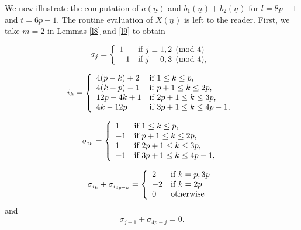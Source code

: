 \documentclass[11pt,reqno]{amsart}
\theoremstyle{definition}
\numberwithin{equation}{section}
\begin{document}
We now illustrate the computation of $a({\underline{n}})$ and $b_1({\underline{n}}) + b_2({\underline{n}})$ for $l=8p-1$ and $t=6p-1$. The routine evaluation of $X(\underline{n})$
is left to the reader. First, we take $m=2$ in Lemmas \ref{l8} and \ref{l9} to obtain

\begin{equation} \label{step0}
\sigma_{j} = \left\{
\begin{array}{ll}
1 & \text{if $j \equiv 1, 2 \pmod{4}$} \\
-1 & \text{if $j \equiv 0, 3 \pmod{4},$} \\
\end{array} \right. \\
\end{equation}

\begin{equation} \label{step1}
i_k = \left\{
\begin{array}{ll}
4(p-k) + 2 & \text{if $1 \leq k \leq p$,} \\
4(k-p) - 1 & \text{if $p+1 \leq k \leq 2p$,} \\
12p - 4k + 1 & \text{if $2p+1 \leq k \leq 3p$,} \\
 4k - 12p & \text{if $3p+1 \leq k \leq 4p-1$,} \\
\end{array} \right. \\
\end{equation}

\begin{equation} \label{step2}
\sigma_{i_k} = \left\{
\begin{array}{ll}
1 & \text{if $1 \leq k \leq p$,} \\
-1 & \text{if $p+1 \leq k \leq 2p$,} \\
1 & \text{if $2p+1 \leq k \leq 3p$,} \\
 -1 & \text{if $3p+1 \leq k \leq 4p-1,$} \\
\end{array} \right. \\
\end{equation}

\begin{equation} \label{step3}
\sigma_{i_k} + \sigma_{i_{4p-k}} = \left\{
\begin{array}{ll}
2 & \text{if $k = p, 3p$} \\
-2 & \text{if $k = 2p$} \\
0 & \text{otherwise} \\
\end{array} \right. \\
\end{equation}
and
\begin{equation} \label{step4}
\sigma_{j+1} + \sigma_{4p - j} = 0.
\end{equation}
\end{document}
